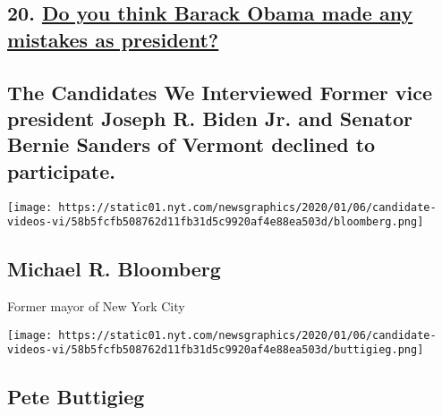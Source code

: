 \hypertarget{20-do-you-think-barack-obama-made-any-mistakes-as-president}{%
\subsection{\texorpdfstring{20.
\href{https://www.nytimes.com/interactive/2020/us/politics/barack-obama-20-questions.html}{Do
you think Barack Obama made any mistakes as
president?}}{20. Do you think Barack Obama made any mistakes as president?}}\label{20-do-you-think-barack-obama-made-any-mistakes-as-president}}

\hypertarget{the-candidates-we-interviewed--former-vice-president-joseph-r-biden-jr-and-senator-bernie-sanders-of-vermont-declined-to-participate-}{%
\subsection{\texorpdfstring{The Candidates We Interviewed Former vice
president Joseph R. Biden Jr. and Senator Bernie Sanders of Vermont
declined to participate.
}{The Candidates We Interviewed  Former vice president Joseph R. Biden Jr. and Senator Bernie Sanders of Vermont declined to participate. }}\label{the-candidates-we-interviewed--former-vice-president-joseph-r-biden-jr-and-senator-bernie-sanders-of-vermont-declined-to-participate-}}

\href{https://www.nytimes.com/interactive/2020/us/politics/michael-r-bloomberg-20-questions.html}{}

\texttt{[image: https://static01.nyt.com/newsgraphics/2020/01/06/candidate-videos-vi/58b5fcfb508762d11fb31d5c9920af4e88ea503d/bloomberg.png]}

\hypertarget{michael-r-bloomberg}{%
\subsection{Michael R. Bloomberg}\label{michael-r-bloomberg}}

Former mayor of New York City

\href{https://www.nytimes.com/interactive/2020/us/politics/pete-buttigieg-20-questions.html}{}

\texttt{[image: https://static01.nyt.com/newsgraphics/2020/01/06/candidate-videos-vi/58b5fcfb508762d11fb31d5c9920af4e88ea503d/buttigieg.png]}

\hypertarget{pete-buttigieg}{%
\subsection{Pete Buttigieg}\label{pete-buttigieg}}

